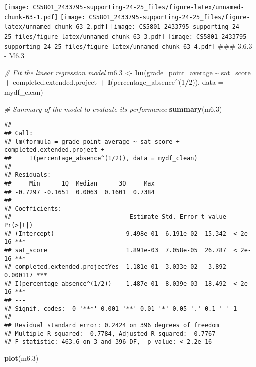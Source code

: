 \documentclass[
]{article}
\newenvironment{Shaded}{\begin{snugshade}}{\end{snugshade}}
\newcommand{\AttributeTok}[1]{\textcolor[rgb]{0.13,0.29,0.53}{#1}}
\newcommand{\CommentTok}[1]{\textcolor[rgb]{0.56,0.35,0.01}{\textit{#1}}}
\newcommand{\DecValTok}[1]{\textcolor[rgb]{0.00,0.00,0.81}{#1}}
\newcommand{\FloatTok}[1]{\textcolor[rgb]{0.00,0.00,0.81}{#1}}
\newcommand{\FunctionTok}[1]{\textcolor[rgb]{0.13,0.29,0.53}{\textbf{#1}}}
\newcommand{\NormalTok}[1]{#1}
\newcommand{\OtherTok}[1]{\textcolor[rgb]{0.56,0.35,0.01}{#1}}
\newcommand{\SpecialCharTok}[1]{\textcolor[rgb]{0.81,0.36,0.00}{\textbf{#1}}}
\begin{document}
\texttt{[image: CS5801\_2433795-supporting-24-25\_files/figure-latex/unnamed-chunk-63-1.pdf]}
\texttt{[image: CS5801\_2433795-supporting-24-25\_files/figure-latex/unnamed-chunk-63-2.pdf]}
\texttt{[image: CS5801\_2433795-supporting-24-25\_files/figure-latex/unnamed-chunk-63-3.pdf]}
\texttt{[image: CS5801\_2433795-supporting-24-25\_files/figure-latex/unnamed-chunk-63-4.pdf]}
\#\#\# 3.6.3 - M6.3

\begin{Shaded}
\begin{Highlighting}[]
\CommentTok{\# Fit the linear regression model}
\NormalTok{m6}\FloatTok{.3} \OtherTok{\textless{}{-}} \FunctionTok{lm}\NormalTok{(grade\_point\_average }\SpecialCharTok{\textasciitilde{}}\NormalTok{ sat\_score }\SpecialCharTok{+}\NormalTok{ completed.extended.project }\SpecialCharTok{+} \FunctionTok{I}\NormalTok{(percentage\_absence}\SpecialCharTok{\^{}}\NormalTok{(}\DecValTok{1}\SpecialCharTok{/}\DecValTok{2}\NormalTok{)), }\AttributeTok{data =}\NormalTok{ mydf\_clean)}

\CommentTok{\# Summary of the model to evaluate its performance}
\FunctionTok{summary}\NormalTok{(m6}\FloatTok{.3}\NormalTok{)}
\end{Highlighting}
\end{Shaded}

\begin{verbatim}
## 
## Call:
## lm(formula = grade_point_average ~ sat_score + completed.extended.project + 
##     I(percentage_absence^(1/2)), data = mydf_clean)
## 
## Residuals:
##     Min      1Q  Median      3Q     Max 
## -0.7297 -0.1651  0.0063  0.1601  0.7384 
## 
## Coefficients:
##                                 Estimate Std. Error t value Pr(>|t|)    
## (Intercept)                    9.498e-01  6.191e-02  15.342  < 2e-16 ***
## sat_score                      1.891e-03  7.058e-05  26.787  < 2e-16 ***
## completed.extended.projectYes  1.181e-01  3.033e-02   3.892 0.000117 ***
## I(percentage_absence^(1/2))   -1.487e-01  8.039e-03 -18.492  < 2e-16 ***
## ---
## Signif. codes:  0 '***' 0.001 '**' 0.01 '*' 0.05 '.' 0.1 ' ' 1
## 
## Residual standard error: 0.2424 on 396 degrees of freedom
## Multiple R-squared:  0.7784, Adjusted R-squared:  0.7767 
## F-statistic: 463.6 on 3 and 396 DF,  p-value: < 2.2e-16
\end{verbatim}

\begin{Shaded}
\begin{Highlighting}[]
\FunctionTok{plot}\NormalTok{(m6}\FloatTok{.3}\NormalTok{)}
\end{Highlighting}
\end{Shaded}
\end{document}
